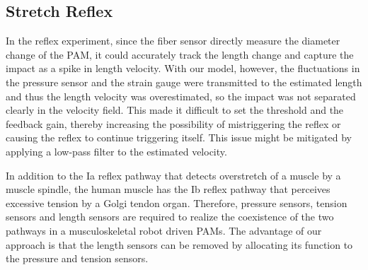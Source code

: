 \subsection{Stretch Reflex}
In the reflex experiment, since the fiber sensor directly measure the diameter change of the PAM, it could accurately track the length change and capture the impact as a spike in length velocity. With our model, however, the fluctuations in the pressure sensor and the strain gauge were transmitted to the estimated length and thus the length velocity was overestimated, so the impact was not separated clearly in the velocity field. This made it difficult to set the threshold and the feedback gain, thereby increasing the possibility of mistriggering the reflex or causing the reflex to continue triggering itself. This issue might be mitigated by applying a low-pass filter to the estimated velocity.

In addition to the Ia reflex pathway that detects overstretch of a muscle by a muscle spindle, the human muscle has the Ib reflex pathway that perceives excessive tension by a Golgi tendon organ. Therefore, pressure sensors, tension sensors and length sensors are required to realize the coexistence of the two pathways in a musculoskeletal robot driven PAMs. The advantage of our approach is that the length sensors can be removed by allocating its function to the pressure and tension sensors.










